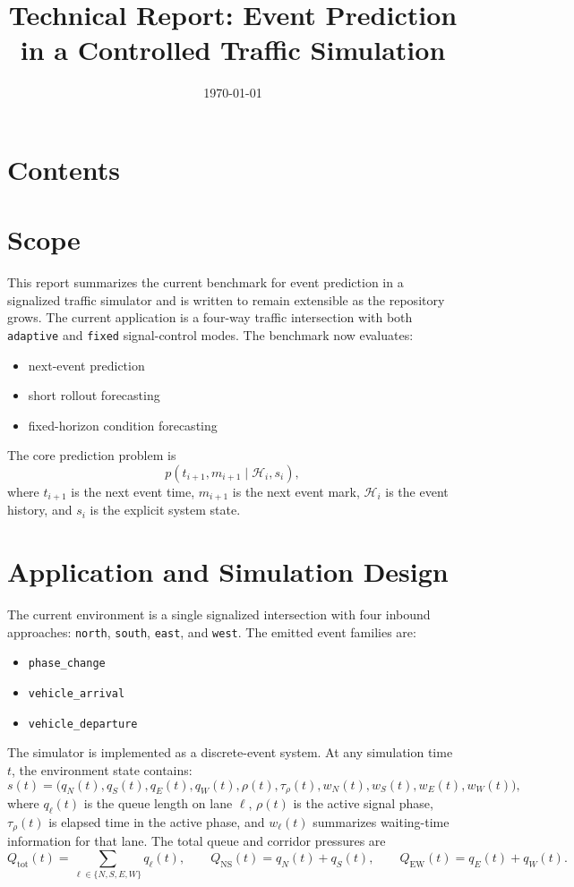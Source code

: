 \documentclass[11pt]{article}
\title{Technical Report: Event Prediction in a Controlled Traffic Simulation}
\author{}
\date{\today}
\begin{document}
\maketitle
{}
\section*{Contents}
\tableofcontents
\clearpage

\section{Scope}

This report summarizes the current benchmark for event prediction in a signalized traffic simulator and is written to remain extensible as the repository grows. The current application is a four-way traffic intersection with both \texttt{adaptive} and \texttt{fixed} signal-control modes. The benchmark now evaluates:

\begin{itemize}
  \item next-event prediction
  \item short rollout forecasting
  \item fixed-horizon condition forecasting
\end{itemize}

The core prediction problem is
\[
p(t_{i+1}, m_{i+1} \mid \mathcal{H}_i, s_i),
\]
where \(t_{i+1}\) is the next event time, \(m_{i+1}\) is the next event mark, \(\mathcal{H}_i\) is the event history, and \(s_i\) is the explicit system state.

\section{Application and Simulation Design}

The current environment is a single signalized intersection with four inbound approaches:
\texttt{north}, \texttt{south}, \texttt{east}, and \texttt{west}. The emitted event families are:

\begin{itemize}
  \item \texttt{phase\_change}
  \item \texttt{vehicle\_arrival}
  \item \texttt{vehicle\_departure}
\end{itemize}

The simulator is implemented as a discrete-event system. At any simulation time \(t\), the environment state contains:
\[
s(t) =
\big(
q_N(t), q_S(t), q_E(t), q_W(t),
\rho(t),
\tau_{\rho}(t),
w_N(t), w_S(t), w_E(t), w_W(t)
\big),
\]
where \(q_\ell(t)\) is the queue length on lane \(\ell\), \(\rho(t)\) is the active signal phase, \(\tau_{\rho}(t)\) is elapsed time in the active phase, and \(w_\ell(t)\) summarizes waiting-time information for that lane. The total queue and corridor pressures are
\[
Q_{\mathrm{tot}}(t) = \sum_{\ell \in \{N,S,E,W\}} q_\ell(t),
\qquad
Q_{\mathrm{NS}}(t) = q_N(t) + q_S(t),
\qquad
Q_{\mathrm{EW}}(t) = q_E(t) + q_W(t).
\]
\end{document}
